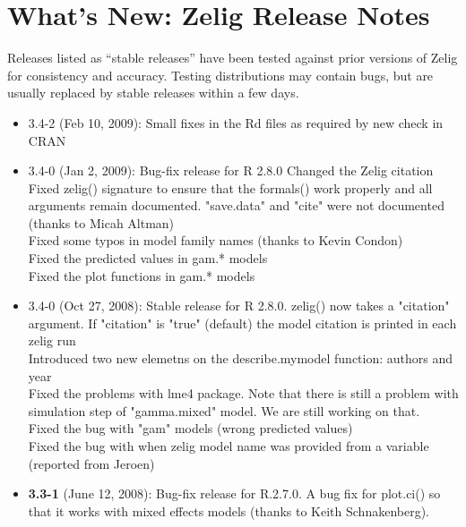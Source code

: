 
\section{What's New:  Zelig Release Notes}\label{release.notes}

Releases listed as ``stable releases'' have been tested against prior
versions of Zelig for consistency and accuracy.  Testing distributions
may contain bugs, but are usually replaced by stable releases within a
few days. 

\begin{itemize} 

\item {3.4-2} (Feb 10, 2009): Small fixes in the Rd files as required 
by new check in CRAN \\

\item {3.4-0} (Jan 2, 2009): Bug-fix release for R 2.8.0
Changed the Zelig citation \\
Fixed zelig() signature to ensure that the formals() work properly 
and all arguments remain documented. "save.data" and "cite" were not 
documented (thanks to Micah Altman)\\
Fixed some typos in model family names (thanks to Kevin Condon)\\
Fixed the predicted values in gam.* models \\
Fixed the plot functions in gam.* models \\

\item {3.4-0} (Oct 27, 2008): Stable release for R 2.8.0.
zelig() now takes a "citation" argument. If "citation" is "true" (default)
the model citation is printed in each zelig run \\
Introduced two new elemetns on the describe.mymodel function: authors and year \\
Fixed the problems with lme4 package. Note that there is still a problem with 
simulation step of "gamma.mixed" model. We are still working on that. \\
Fixed the bug with "gam" models (wrong predicted values) \\
Fixed the bug with when zelig model name was provided from a variable (reported from 
Jeroen)

  
\item {\bf 3.3-1} (June 12, 2008): Bug-fix release for R.2.7.0. A bug
  fix for {\rm plot.ci()} so that it works with mixed effects models
  (thanks to Keith Schnakenberg).
  

\end{itemize}
